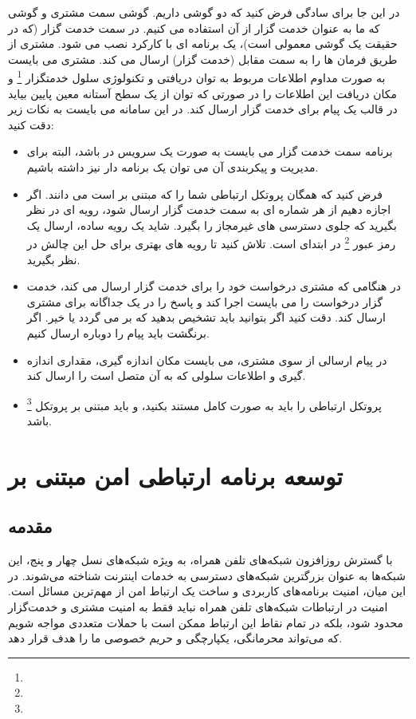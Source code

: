 \documentclass{report}
\begin{document}
در این جا برای سادگی فرض کنید که دو گوشی داریم. گوشی سمت مشتری و گوشی که ما به عنوان خدمت گزار از آن استفاده می کنیم. در سمت خدمت گزار (که در حقیقت یک گوشی معمولی است)، یک برنامه
 ای با کارکرد
  نصب می شود.
مشتری از طریق
  فرمان ها را به سمت مقابل (خدمت گزار) ارسال می کند. مشتری می بایست به صورت مداوم اطلاعات مربوط به توان دریافتی و تکنولوژی سلول خدمتگزار
  \footnote{}
  و مکان دریافت این اطلاعات را در صورتی که توان از یک سطح آستانه معین پایین بیاید در قالب یک پیام برای خدمت گزار ارسال کند. در این سامانه می بایست به نکات زیر دقت کنید:
  \begin{itemize}
  	\item
  	برنامه سمت خدمت گزار می بایست به صورت یک سرویس در 
  	باشد، البته برای مدیریت و پیکربندی آن می توان یک برنامه
  	 دار نیز داشته باشیم.
  	\item
  	فرض کنید که همگان پروتکل ارتباطی شما را که مبتنی بر
  	  است می دانند. اگر اجازه دهیم
  	    از هر شماره ای به سمت خدمت گزار ارسال شود، رویه ای در نظر بگیرید که جلوی دسترسی های غیرمجاز را بگیرد. شاید یک رویه ساده، ارسال یک رمز عبور
  	    \footnote{}
  	     در ابتدای
  	     است. تلاش کنید تا رویه های بهتری برای حل این چالش در نظر بگیرید.
  	\item
  	در هنگامی که مشتری درخواست خود را برای خدمت گزار ارسال می کند، خدمت گزار درخواست را می بایست اجرا کند و پاسخ را در یک
  	 جداگانه برای مشتری ارسال کند. دقت کنید اگر بتوانید باید تشخیص بدهید که 
  	 بر می گردد یا خیر. اگر برنگشت باید پیام را دوباره ارسال کنیم.
  	\item
  	در پیام ارسالی از سوی مشتری، می بایست مکان اندازه گیری، مقداری اندازه گیری و اطلاعات سلولی که به آن متصل است را ارسال کند.
  	\item 
  	پروتکل ارتباطی را باید به صورت کامل مستند بکنید، و باید مبتنی بر پروتکل 
  	\footnote{}
  	 باشد.
  \end{itemize}

\chapter{توسعه برنامه ارتباطی امن مبتنی بر
	 }
	 
\section{مقدمه}
با گسترش روزافزون شبکه‌های تلفن همراه، به ویژه شبکه‌های نسل چهار و پنج، این شبکه‌ها به عنوان بزرگترین شبکه‌های دسترسی به خدمات اینترنت شناخته می‌شوند. در این میان، امنیت برنامه‌های کاربردی و ساخت یک ارتباط امن از مهم‌ترین مسائل است. امنیت در ارتباطات شبکه‌های تلفن همراه نباید فقط به امنیت مشتری و خدمت‌گزار محدود شود، بلکه در تمام نقاط این ارتباط ممکن است با حملات متعددی مواجه شویم که می‌تواند محرمانگی، یکپارچگی و حریم خصوصی ما را هدف قرار دهد.
\end{document}
